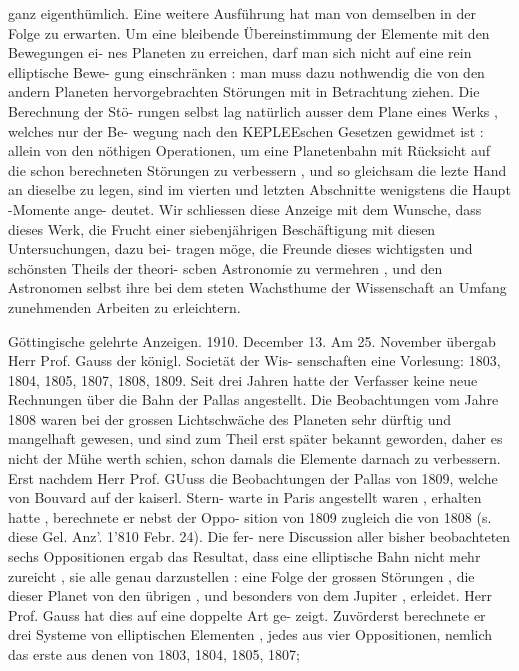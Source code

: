 \documentclass[12pt,a4paper]{article}
\begin{document}
\newpage

ganz  eigenthümlich.  Eine  weitere  Ausführung  hat  man  von  demselben  in  der
Folge  zu  erwarten.
Um  eine  bleibende  Übereinstimmung  der  Elemente  mit  den  Bewegungen  ei-
nes Planeten  zu  erreichen,  darf  man  sich  nicht  auf  eine  rein  elliptische  Bewe-
gung einschränken :  man  muss  dazu  nothwendig  die  von  den  andern  Planeten
hervorgebrachten  Störungen  mit  in  Betrachtung  ziehen.  Die  Berechnung  der  Stö-
rungen selbst  lag  natürlich  ausser  dem  Plane  eines  Werks ,  welches  nur  der  Be-
wegung nach  den  KEPLEEschen  Gesetzen  gewidmet  ist :  allein  von  den  nöthigen
Operationen,  um  eine  Planetenbahn  mit  Rücksicht  auf  die  schon  berechneten
Störungen  zu  verbessern ,  und  so  gleichsam  die  lezte  Hand  an  dieselbe  zu  legen,
sind  im  vierten  und  letzten  Abschnitte  wenigstens  die  Haupt -Momente  ange-
deutet.
Wir  schliessen  diese  Anzeige  mit  dem  Wunsche,  dass  dieses  Werk,  die
Frucht  einer  siebenjährigen  Beschäftigung  mit  diesen  Untersuchungen,  dazu  bei-
tragen möge,  die  Freunde  dieses  wichtigsten  und  schönsten  Theils  der  theori-
scben  Astronomie  zu  vermehren ,  und  den  Astronomen  selbst  ihre  bei  dem  steten
Wachsthume  der  Wissenschaft  an  Umfang  zunehmenden  Arbeiten  zu  erleichtern.

\newpage

Göttingische  gelehrte  Anzeigen.     1910.    December  13.
Am  25.  November  übergab  Herr  Prof.  Gauss  der  königl.  Societät  der  Wis-
senschaften eine  Vorlesung:
1803,  1804,  1805,  1807,  1808,  1809.
Seit  drei  Jahren  hatte  der  Verfasser  keine  neue  Rechnungen  über  die  Bahn
der  Pallas  angestellt.  Die  Beobachtungen  vom  Jahre  1808  waren  bei  der  grossen
Lichtschwäche  des  Planeten  sehr  dürftig  und  mangelhaft  gewesen,  und  sind  zum
Theil  erst  später  bekannt  geworden,  daher  es  nicht  der  Mühe  werth  schien,  schon
damals  die  Elemente  darnach  zu  verbessern.  Erst  nachdem  Herr  Prof.  GUuss  die
Beobachtungen  der  Pallas  von  1809,  welche  von  Bouvard  auf  der  kaiserl.  Stern-
warte in  Paris  angestellt  waren ,  erhalten  hatte ,  berechnete  er  nebst  der  Oppo-
sition von  1809  zugleich  die  von  1808  (s.  diese  Gel.  Anz'.  1'810  Febr.  24).  Die  fer-
nere Discussion  aller  bisher  beobachteten  sechs  Oppositionen  ergab  das  Resultat,
dass  eine  elliptische  Bahn  nicht  mehr  zureicht ,  sie  alle  genau  darzustellen :  eine
Folge  der  grossen  Störungen ,  die  dieser  Planet  von  den  übrigen ,  und  besonders
von  dem  Jupiter ,  erleidet.  Herr  Prof.  Gauss  hat  dies  auf  eine  doppelte  Art  ge-
zeigt. Zuvörderst  berechnete  er  drei  Systeme  von  elliptischen  Elementen ,  jedes
aus  vier  Oppositionen,  nemlich  das  erste  aus  denen  von  1803,  1804,  1805,  1807;
\end{document}
